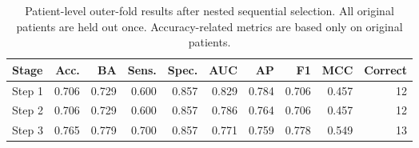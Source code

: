 \begin{table}[t]
\centering
\caption{Patient-level outer-fold results after nested sequential selection. All original patients are held out once. Accuracy-related metrics are based only on original patients.}
\label{tab:nested_stages}
\footnotesize
\setlength{\tabcolsep}{4pt}
\begin{tabular}{lrrrrrrrrr}
\toprule
Stage & Acc. & BA & Sens. & Spec. & AUC & AP & F1 & MCC & Correct \\
\midrule
Step 1 & 0.706 & 0.729 & 0.600 & 0.857 & 0.829 & 0.784 & 0.706 & 0.457 & 12 \\
Step 2 & 0.706 & 0.729 & 0.600 & 0.857 & 0.786 & 0.764 & 0.706 & 0.457 & 12 \\
Step 3 & 0.765 & 0.779 & 0.700 & 0.857 & 0.771 & 0.759 & 0.778 & 0.549 & 13 \\
\bottomrule
\end{tabular}
\end{table}
